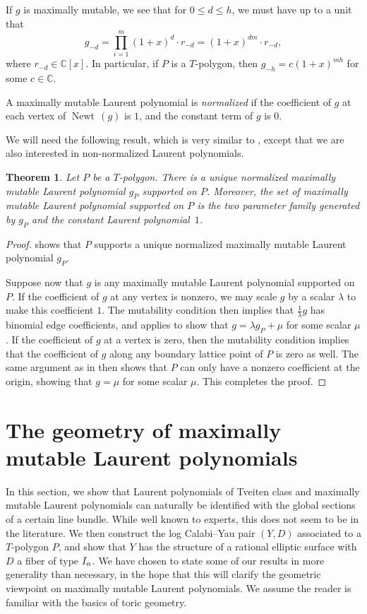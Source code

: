 \documentclass[11pt]{article}
\numberwithin{equation}{section}
\newtheorem{Theorem}{Theorem}[section]
\DeclareMathOperator{\Newt}{{Newt \,}}
\newcommand{\CC}{\mathbb{C}}
\begin{document}
If $g$ is maximally mutable, we see that for $0 \leq d \leq h$, we must have up to a unit that
	\[
	g_{-d}=\prod_{i=1}^m (1+x)^{d} \cdot r_{-d}=(1+x)^{dm} \cdot r_{-d},
	\]
	where $r_{-d} \in \CC[x]$. In particular, if $P$ is a $T$-polygon, then $g_{-h}=c(1+x)^{mh}$ for some $c \in \CC$.
		\begin{Definition}\label{def:normalized}
		A maximally mutable Laurent polynomial is \emph{normalized} if the coefficient of $g$ at each vertex of $\Newt(g)$ is $1$, and the constant term of $g$ is $0$.
	\end{Definition}
We will need the following result, which is very similar to \cite[Proposition 3.7]{Coates2021}, except that we are also interested in non-normalized Laurent polynomials.
\begin{Theorem}\label{thm:MMLP}
	Let $P$ be a $T$-polygon. There is a unique normalized maximally mutable Laurent polynomial $g_P$ supported on $P$. Moreover, the set of maximally mutable Laurent polynomial supported on $P$ is the two parameter family generated by $g_P$ and
	the constant Laurent polynomial~$1$.
\end{Theorem}
\begin{proof}
\cite[Proposition 3.7]{Coates2021} shows that $P$ supports a unique normalized maximally mutable Laurent polynomial $g_P$.

Suppose now that $g$ is any maximally mutable Laurent polynomial supported on $P$. If the coefficient of $g$ at any vertex is nonzero, we may scale $g$ by a scalar $\lambda$ to make this coefficient $1$. The mutability condition then implies that $\tfrac{1}{\lambda}g$ has binomial edge coefficients, and \cite[Proposition~3.7]{Coates2021} applies to show that $g=\lambda g_P+\mu$ for some scalar $\mu$.
If the coefficient of $g$ at a vertex is zero, then the mutability condition implies that the coefficient of $g$ along any boundary lattice point of $P$ is zero as well. The same argument as in \cite[Proposition 3.7]{Coates2021} then shows that $P$ can only have a nonzero coefficient at the origin, showing that $g=\mu$ for some scalar $\mu$. This completes the proof.
\end{proof}

	\section{The geometry of maximally mutable Laurent polynomials}\label{sec:geometry}
In this section, we show that Laurent polynomials of Tveiten class and maximally mutable Laurent polynomials can naturally be identified with the global sections of a certain line bundle. While well known to experts, this does not seem to be in the literature.
We then construct the log Calabi--Yau pair $(Y, D)$ associated to a $T$-polygon $P$, and show that $Y$ has the structure of a rational elliptic surface with $D$ a fiber of type ${\rm I}_n$. We have chosen to state some of our results in more generality than necessary, in the hope that this will clarify the geometric viewpoint on maximally mutable Laurent polynomials. We assume the reader is familiar with the basics of toric geometry.
\end{document}
